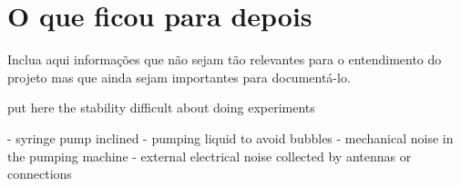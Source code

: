 \chapter{O que ficou para depois}

Inclua aqui informações que não sejam tão relevantes para o entendimento do projeto mas que ainda sejam importantes para documentá-lo. 


put here the stability difficult about doing experiments

- syringe pump inclined
- pumping liquid to avoid bubbles
- mechanical noise in the pumping machine
- external electrical noise collected by antennas or connections
